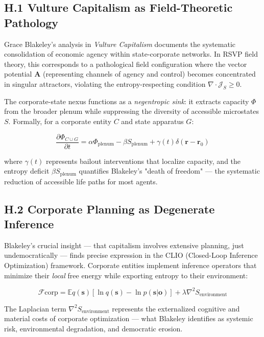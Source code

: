 \documentclass[11pt,a4paper,titlepage]{article}
\theoremstyle{definition}
\begin{document}
\begin{itemize}
\subsection*{H.1 Vulture Capitalism as Field-Theoretic Pathology}

Grace Blakeley's analysis in \emph{Vulture Capitalism} documents the systematic consolidation of economic agency within state-corporate networks. In RSVP field theory, this corresponds to a pathological field configuration where the vector potential $\mathbf{A}$ (representing channels of agency and control) becomes concentrated in singular attractors, violating the entropy-respecting condition $\nabla \cdot \mathcal{J}_S \geq 0$.

The corporate-state nexus functions as a \emph{negentropic sink}: it extracts capacity $\Phi$ from the broader plenum while suppressing the diversity of accessible microstates $S$. Formally, for a corporate entity $C$ and state apparatus $G$:

\begin{equation}
\frac{\partial\Phi_{C\cup G}}{\partial t} = \alpha \Phi_{\text{plenum}} - \beta S_{\text{plenum}} + \gamma(t)\delta(\mathbf{r}-\mathbf{r}_0)
\label{eq:extraction}
\end{equation}

where $\gamma(t)$ represents bailout interventions that localize capacity, and the entropy deficit $\beta S_{\text{plenum}}$ quantifies Blakeley's "death of freedom" — the systematic reduction of accessible life paths for most agents.

\subsection*{H.2 Corporate Planning as Degenerate Inference}

Blakeley's crucial insight — that capitalism involves extensive planning, just undemocratically — finds precise expression in the CLIO (Closed-Loop Inference Optimization) framework. Corporate entities implement inference operators that minimize their \emph{local} free energy while exporting entropy to their environment:

\begin{equation}
\mathcal{F}{\text{corp}} = \mathbb{E}{q(\mathbf{s})}[\ln q(\mathbf{s}) - \ln p(\mathbf{s}|\mathbf{o})]+ \lambda \nabla^2 S_{\text{environment}}
\label{eq:corp_inference}
\end{equation}

The Laplacian term $\nabla^2 S_{\text{environment}}$ represents the externalized cognitive and material costs of corporate optimization — what Blakeley identifies as systemic risk, environmental degradation, and democratic erosion.


\end{itemize}
\end{document}
